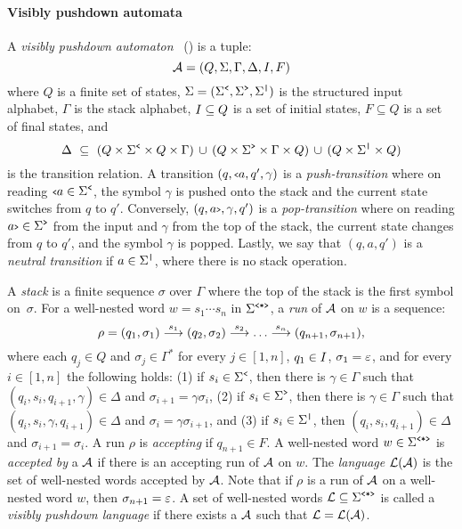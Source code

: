 \paragraph{Visibly pushdown automata} A \emph{visibly pushdown automaton}~\cite{AlurM04} (\vpa) is a tuple:
$$
\mathcal{A} = (Q, \Sigma, \Gamma, \Delta, I, F)
$$ 
where $Q$ is a finite set of states, $\Sigma = (\Sigma^{\texttt{<}}, \Sigma^{\texttt{>}}, \Sigma^{\texttt{|}})$ is the structured input alphabet, $\Gamma$ is the stack alphabet, $I \subseteq Q$ is a set of initial states, $F\subseteq Q$ is a set of final states, and
$$
\Delta \ \subseteq \ (Q\times\opS\times Q\times\Gamma) \,\cup \, (Q\times\clS\times\Gamma\times Q) \, \cup \, (Q\times\noS\times Q)
$$ 
is the transition relation.
A transition $(q,{\scriptsize\texttt{<}} a,q',\gamma)$ is a {\em push-transition} where on reading ${\scriptsize\texttt{<}} a\in\Sigma^{\texttt{<}}$, the symbol $\gamma$ is pushed onto the stack and the current state switches from $q$ to $q'$. Conversely, $(q,a{\scriptsize\texttt{>}},\gamma,q')$ is a {\em pop-transition} where on reading $a{\scriptsize\texttt{>}}\in\Sigma^{\texttt{>}}$ from the input and $\gamma$ from the top of the stack, the current state changes from $q$ to $q'$, and the symbol $\gamma$ is popped. Lastly, we say that $(q,a,q')$ is a {\em neutral transition} if $a\in\Sigma^{\texttt{|}}$, where there is no stack operation.

A \emph{stack} is a finite sequence $\sigma$ over $\Gamma$ where the top of the stack is the first symbol on~$\sigma$. For a well-nested word $w = s_1 \cdots s_n$ in $\Sigma^{\texttt{<*>}}$, a \emph{run} of $\mathcal{A}$ on $w$ is a sequence:
$$
\rho = (q_1,\sigma_1) \overset{s_1}{\longrightarrow} (q_2,\sigma_2) \overset{s_2}{\longrightarrow} \ldots \overset{s_n}{\longrightarrow} (q_{n+1},\sigma_{n+1}),
$$ 
where each $q_j \in Q$ and $\sigma_j\in\Gamma^{*}$ for every $j\in[1,n]$, $q_1\in I$, $\sigma_1 = \varepsilon$, and for every $i\in[1,n]$ the following holds: 
(1) if $s_{i}\in\Sigma^{\texttt{<}}$, then there is $\gamma\in\Gamma$ such that $(q_i,s_{i},q_{i+1},\gamma) \in \Delta$ and $\sigma_{i+1} = \gamma\sigma_i$, 
(2) if $s_{i}\in\Sigma^{\texttt{>}}$, then there is $\gamma\in\Gamma$ such that $(q_i,s_{i},\gamma,q_{i+1}) \in \Delta$ and $\sigma_{i} = \gamma\sigma_{i+1}$, and
(3) if $s_{i}\in\Sigma^{\texttt{|}}$, then $(q_i,s_{i},q_{i+1}) \in \Delta$ and $\sigma_{i+1} = \sigma_i$.
A run $\rho$ is \emph{accepting} if $q_{n+1}\in F$. A well-nested word $w\in\Sigma^{\texttt{<*>}}$ is \emph{accepted by} a \vpa $\mathcal{A}$ if there is an accepting run of $\mathcal{A}$ on $w$. The \emph{language} $\mathcal{L}(\mathcal{A})$ is the set of well-nested words accepted by $\mathcal{A}$. Note that if $\rho$ is a run of $\mathcal{A}$ on a well-nested word $w$, then $\sigma_{n+1} = \varepsilon$. A set of well-nested words $\mathcal{L} \subseteq \Sigma^{\texttt{<*>}}$ is called a \emph{visibly pushdown language} if there exists a \vpa $\mathcal{A}$ such that $\mathcal{L} = \mathcal{L}(\mathcal{A})$.

